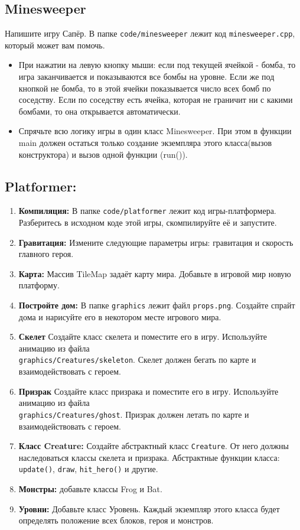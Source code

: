\documentclass{article}
\begin{document}
\subsection*{Minesweeper}
Напишите игру Сапёр. В папке \texttt{code/minesweeper} лежит код \texttt{minesweeper.cpp}, который может вам помочь.
\begin{itemize}
\item При нажатии на левую кнопку мыши: если под текущей ячейкой - бомба, то игра заканчивается и показываются все бомбы на уровне. Если же под кнопкой не бомба, то в этой ячейки показывается число всех бомб по соседству. Если по соседству есть ячейка, которая не граничит ни с какими бомбами, то она открывается автоматически.
\item Спрячьте всю логику игры в один класс Minesweeper. При этом в функции main должен остаться только создание экземпляра этого класса(вызов конструктора) и вызов одной функции (run()).
\end{itemize}

\subsection*{Platformer:}
\begin{enumerate}
\item \textbf{Компиляция:} В папке \texttt{code/platformer} лежит код игры-платформера. Разберитесь в исходном коде этой игры, скомпилируйте её и запустите.\\
\item \textbf{Гравитация:} Измените следующие параметры игры: гравитация и скорость главного героя.\\
\item \textbf{Карта:} Массив TileMap задаёт карту мира. Добавьте в игровой мир новую платформу.\\
\item \textbf{Постройте дом:} В папке \texttt{graphics} лежит файл \texttt{props.png}. Создайте спрайт дома и нарисуйте его в некотором месте игрового мира.\\
\item \textbf{Скелет} Создайте класс скелета и поместите его в игру. Используйте анимацию из файла\\ \texttt{graphics/Creatures/skeleton}. Скелет должен бегать по карте и взаимодействовать с героем.
\item \textbf{Призрак} Создайте класс призрака и поместите его в игру. Используйте анимацию из файла\\ \texttt{graphics/Creatures/ghost}. Призрак должен летать по карте и взаимодействовать с героем.
\item \textbf{Класс Creature:} Создайте абстрактный класс \texttt{Creature}. От него должны наследоваться классы скелета и призрака. Абстрактные функции класса: \texttt{update()}, \texttt{draw}, \texttt{hit\_hero()} и другие.
\item \textbf{Монстры:} добавьте классы Frog и Bat.
\item \textbf{Уровни:} Добавьте класс Уровень. Каждый экземпляр этого класса будет определять положение всех блоков, героя и монстров.
\end{enumerate}
\end{document}
